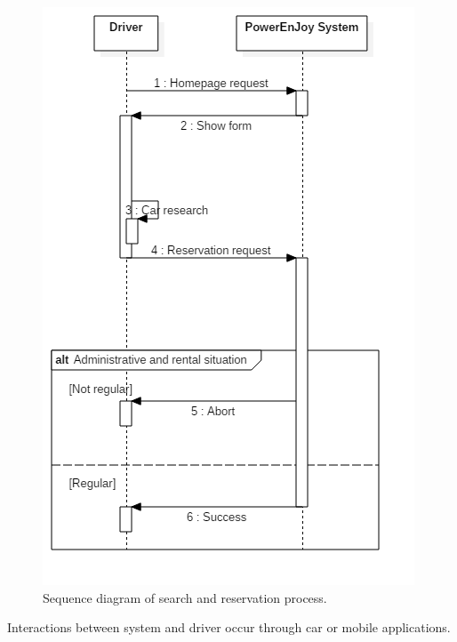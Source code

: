 \begin{figure}[H]
	\begin{center}
		\centering
		\includegraphics[height=0.9\textheight, keepaspectratio]{sequence_diagram/SearchReservation.png}
		\caption{Sequence diagram of search and reservation process.}
	\end{center}
\end{figure}


Interactions between system and driver occur through car or mobile applications.

